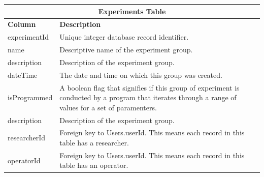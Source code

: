 \documentclass{sig-alternate}
\begin{document}
\begin{table}[h!]
\centering
\begin{tabular}{l p{6cm}}
\multicolumn{2}{c}{\bf Experiments Table} \\ \hline
{\bf Column} & {\bf Description}\\ \hline
experimentId & Unique integer database record identifier.\\ \hline
name & Descriptive name of the experiment group.\\ \hline
description & Description of the experiment group.\\ \hline
dateTime & The date and time on which this group was created.\\ \hline
isProgrammed & A boolean flag that signifies if this group of experiment is conducted by a program that iterates through a range of values for a set of paramenters.\\ \hline
description & Description of the experiment group.\\ \hline
researcherId & Foreign key to Users.userId. This means each record in this table has a researcher.\\ \hline
operatorId & Foreign key to Users.userId. This means each record in this table has an operator.\\ \hline
\end{tabular}
\end{table}
\end{document}
